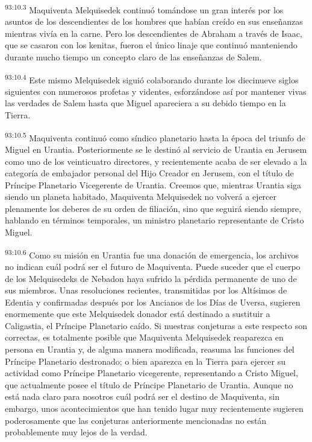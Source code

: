 \par
\textsuperscript{93:10.3} Maquiventa Melquisedek continuó tomándose un gran interés por los asuntos de los descendientes de los hombres que habían creído en sus enseñanzas mientras vivía en la carne. Pero los descendientes de Abraham a través de Isaac, que se casaron con los kenitas, fueron el único linaje que continuó manteniendo durante mucho tiempo un concepto claro de las enseñanzas de Salem.

\par
\textsuperscript{93:10.4} Este mismo Melquisedek siguió colaborando durante los diecinueve siglos siguientes con numerosos profetas y videntes, esforzándose así por mantener vivas las verdades de Salem hasta que Miguel apareciera a su debido tiempo en la Tierra.

\par
\textsuperscript{93:10.5} Maquiventa continuó como síndico planetario hasta la época del triunfo de Miguel en Urantia. Posteriormente se le destinó al servicio de Urantia en Jerusem como uno de los veinticuatro directores, y recientemente acaba de ser elevado a la categoría de embajador personal del Hijo Creador en Jerusem, con el título de Príncipe Planetario Vicegerente de Urantia. Creemos que, mientras Urantia siga siendo un planeta habitado, Maquiventa Melquisedek no volverá a ejercer plenamente los deberes de su orden de filiación, sino que seguirá siendo siempre, hablando en términos temporales, un ministro planetario representante de Cristo Miguel.

\par
\textsuperscript{93:10.6} Como su misión en Urantia fue una donación de emergencia, los archivos no indican cuál podrá ser el futuro de Maquiventa. Puede suceder que el cuerpo de los Melquisedeks de Nebadon haya sufrido la pérdida permanente de uno de sus miembros. Unas resoluciones recientes, transmitidas por los Altísimos de Edentia y confirmadas después por los Ancianos de los Días de Uversa, sugieren enormemente que este Melquisedek donador está destinado a sustituir a Caligastia, el Príncipe Planetario caído. Si nuestras conjeturas a este respecto son correctas, es totalmente posible que Maquiventa Melquisedek reaparezca en persona en Urantia y, de alguna manera modificada, reasuma las funciones del Príncipe Planetario destronado; o bien aparezca en la Tierra para ejercer su actividad como Príncipe Planetario vicegerente, representando a Cristo Miguel, que actualmente posee el título de Príncipe Planetario de Urantia. Aunque no está nada claro para nosotros cuál podrá ser el destino de Maquiventa, sin embargo, unos acontecimientos que han tenido lugar muy recientemente sugieren poderosamente que las conjeturas anteriormente mencionadas no están probablemente muy lejos de la verdad.

